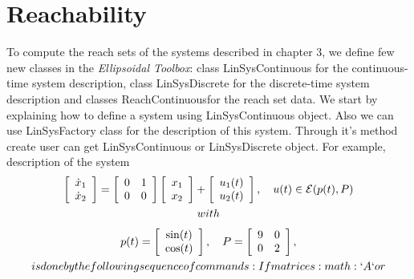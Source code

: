 \documentclass[letterpaper,10pt,english]{sphinxmanual}
\begin{document}
\section{Reachability}
\label{chap_implement:reachability}
To compute the reach sets of the systems described in chapter 3, we
define few new classes in the \emph{Ellipsoidal Toolbox}: class
LinSysContinuous for the continuous-time system description, class
LinSysDiscrete for the discrete-time system description and classes
ReachContinuous\backslashReachDiscrete for the reach set
data. We start by explaining how to define a system using
LinSysContinuous object. Also we can use LinSysFactory class for the
description of this system. Through it’s method create user can get
LinSysContinuous or LinSysDiscrete object. For example, description of
the system
\begin{gather}
\begin{split}  \left[\begin{array}{cc}
  \dot{x}_1\\
  \dot{x}_2\end{array}\right] = \left[\begin{array}{cc}
  0 & 1\\
  0 & 0\end{array}\right]\left[\begin{array}{c}
  x_1\\
  x_2\end{array}\right] + \left[\begin{array}{c}
  u_1(t)\\
  u_2(t)\end{array}\right], ~~~ u(t)\in{\mathcal E}(p(t), P)\end{split}\notag\\\begin{split}with\end{split}\notag
\end{gather}\begin{gather}
\begin{split}  p(t) = \left[\begin{array}{c}
  \sin(t)\\
  \cos(t)\end{array}\right], ~~~ P = \left[\begin{array}{cc}
  9 & 0\\
  0 & 2\end{array}\right],\end{split}\notag\\\begin{split}is done by the following sequence of commands: If matrices :math:`A` or\end{split}\notag
\end{gather}
\end{document}
